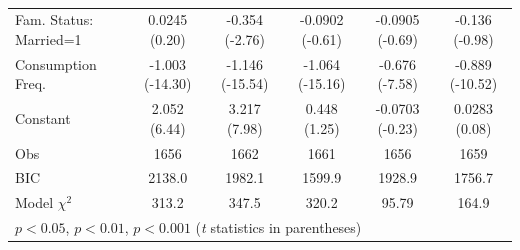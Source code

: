 \begin{landscape}
\begin{table}[here]
\begin{tabular}{l*{5}{c}}
Fam. Status: Married=1        &0.0245 (0.20)         &-0.354\sym{**} (-2.76)         &-0.0902 (-0.61)         &-0.0905 (-0.69)         &-0.136 (-0.98)         \\
Consumption Freq.             &-1.003\sym{***} (-14.30)         &-1.146\sym{***} (-15.54)         &-1.064\sym{***} (-15.16)         &-0.676\sym{***} (-7.58)         &-0.889\sym{***} (-10.52)         \\
Constant                      &2.052\sym{***} (6.44)         &3.217\sym{***} (7.98)         &0.448 (1.25)         &-0.0703 (-0.23)         &0.0283 (0.08)         \\
Obs                           &        1656         &        1662         &        1661         &        1656         &        1659         \\
BIC                           &      2138.0         &      1982.1         &      1599.9         &      1928.9         &      1756.7         \\
Model $\chi^{2}$                 &       313.2         &       347.5         &       320.2         &       95.79         &       164.9         \\

\hline
\multicolumn{6}{l}{\sym{*}\(p<0.05\), \sym{**}\(p<0.01\), \sym{***}\(p<0.001\) (\textit{t} statistics in parentheses)}\\
\end{tabular}
\caption{}
\label{reg-tab1}
\end{table}
\end{landscape}